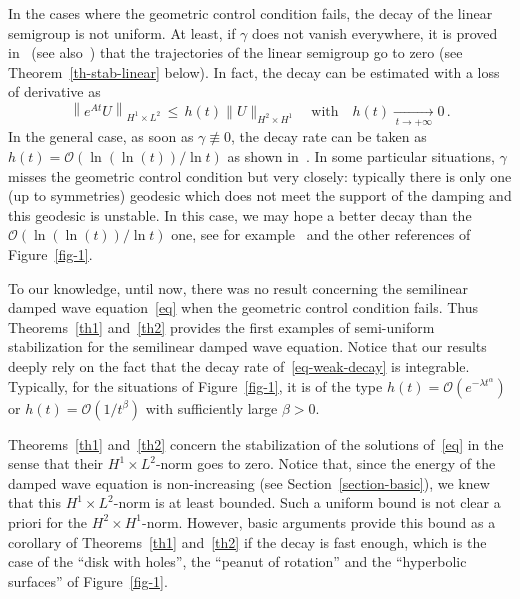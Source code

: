\documentclass[AHL,Unicode,longabstracts]{cedram}
\newcommand{\Oc}{\mathcal{O}}
\begin{document}
In the cases where the geometric control condition fails, the decay of the linear semigroup is not uniform. At least, if $\gamma$ does not vanish everywhere, it is proved in~\cite{Dafermos} (see also~\cite{Haraux}) that the trajectories of the linear semigroup go to zero (see Theorem~\ref{th-stab-linear} below). In fact, the decay can be estimated with a loss of derivative as
\begin{equation}\label{eq-weak-decay}
\left\|e^{At}U\right\|_{H^1\times L^2}\,\leq\, h(t)
\|U\|_{H^2\times H^1}\quad\text{with}\quad h(t)\xrightarrow[\,t\rightarrow +\infty\,]{} 0\,.
\end{equation}
In the general case, as soon as $\gamma\not\equiv 0$, the decay rate can be taken as\linebreak$h(t)=\Oc(\ln(\ln(t))/\ln t)$ as shown in~\cite{Lebeau,Lebeau-Robbiano}. In some particular situations, $\gamma$ misses the geometric control condition but very closely: typically there is only one (up to symmetries) geodesic which does not meet the support of the damping and this geodesic is unstable. In this case, we may hope a better decay than the $\Oc(\ln(\ln(t))/\ln t)$ one, see for example~\cite{CSVW,Leautaud-Lerner} and the other references of Figure~\ref{fig-1}.

To our knowledge, until now, there was no result concerning the semilinear damped wave equation~\eqref{eq} when the geometric control condition fails. Thus Theorems~\ref{th1} and~\ref{th2} provides the first examples of semi-uniform stabilization for the semilinear damped wave equation. Notice that our results deeply rely on the fact that the decay rate of~\eqref{eq-weak-decay} is integrable. Typically, for the situations of Figure~\ref{fig-1}, it is of the type $h(t)=\Oc(e^{-\lambda t^\alpha})$ or $h(t)=\Oc(1/t^\beta)$ with sufficiently large $\beta>0$.


Theorems~\ref{th1} and~\ref{th2} concern the stabilization of the solutions of~\eqref{eq} in the sense that their $H^1\times L^2$-norm goes to zero. Notice that, since the energy of the damped wave equation is non-increasing (see Section~\ref{section-basic}), we knew that this $H^1\times L^2$-norm is at least bounded. Such a uniform bound is not clear a priori for the $H^2\times H^1$-norm. However, basic arguments provide this bound as a corollary of Theorems~\ref{th1} and~\ref{th2} if the decay is fast enough, which is the case of the ``disk with holes'', the ``peanut of rotation'' and the ``hyperbolic surfaces'' of Figure~\ref{fig-1}.
\end{document}
